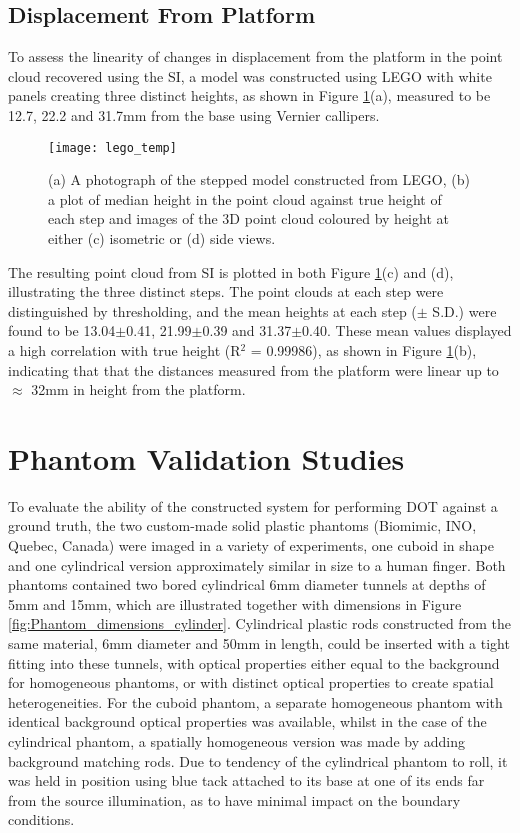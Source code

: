 \documentclass[twoside]{bhamthesis}
\theoremstyle{definition}
\begin{document}
\subsection{Displacement From Platform}

To assess the linearity of changes in displacement from the platform in the point cloud recovered using the SI, a model was constructed using LEGO with white panels creating three distinct heights, as shown in Figure \ref{Lego_imaging}(a), measured to be 12.7, 22.2 and 31.7mm from the base using Vernier callipers.

\begin{figure}[!ht]
\texttt{[image: lego\_temp]}
\centering
\caption{(a) A photograph of the stepped model constructed from LEGO, (b) a plot of median height in the point cloud against true height of each step and images of the 3D point cloud coloured by height at either (c) isometric or (d) side views.}
\label{Lego_imaging}
\end{figure}

The resulting point cloud from SI is plotted in both Figure \ref{Lego_imaging}(c) and (d), illustrating the three distinct steps. The point clouds at each step were distinguished by thresholding, and the mean heights at each step ($\pm$ S.D.) were found to be 13.04$\pm$0.41, 21.99$\pm$0.39 and 31.37$\pm$0.40. These mean values displayed a high correlation with true height (R$^2$ = 0.99986), as shown in Figure \ref{Lego_imaging}(b), indicating that that the distances measured from the platform were linear up to $\approx$ 32mm in height from the platform.

\section{Phantom Validation Studies}

To evaluate the ability of the constructed system for performing DOT against a ground truth, the two custom-made solid plastic phantoms (Biomimic, INO, Quebec, Canada) were imaged in a variety of experiments, one cuboid in shape and one cylindrical version approximately similar in size to a human finger. Both phantoms contained two bored cylindrical 6mm diameter tunnels at depths of 5mm and 15mm, which are illustrated together with dimensions in Figure \ref{fig:Phantom_dimensions_cylinder}. Cylindrical plastic rods constructed from the same material, 6mm diameter and 50mm in length, could be inserted with a tight fitting into these tunnels, with optical properties either equal to the background for homogeneous phantoms, or with distinct optical properties to create spatial heterogeneities. For the cuboid phantom, a separate homogeneous phantom with identical background optical properties was available, whilst in the case of the cylindrical phantom, a spatially homogeneous version was made by adding background matching rods. Due to tendency of the cylindrical phantom to roll, it was held in position using blue tack attached to its base at one of its ends far from the source illumination, as to have minimal impact on the boundary conditions. 
\end{document}
